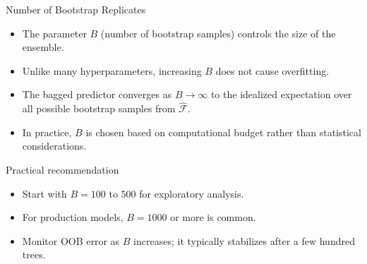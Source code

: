 \begin{frame}{Number of Bootstrap Replicates}
  \begin{itemize}
    \item The parameter $B$ (number of bootstrap samples) controls the size of the ensemble.
    \item Unlike many hyperparameters, increasing $B$ does \alert{not cause overfitting}.
    \item The bagged predictor converges as $B \to \infty$ to the idealized expectation over
          all possible bootstrap samples from $\hat{\mathcal{F}}$.
    \item In practice, $B$ is chosen based on computational budget rather than statistical
          considerations.
  \end{itemize}
  \begin{block}{Practical recommendation}
    \begin{itemize}
      \item Start with $B = 100$ to $500$ for exploratory analysis.
      \item For production models, $B = 1000$ or more is common.
      \item Monitor OOB error as $B$ increases; it typically stabilizes after a few hundred trees.
    \end{itemize}
  \end{block}
\end{frame}

